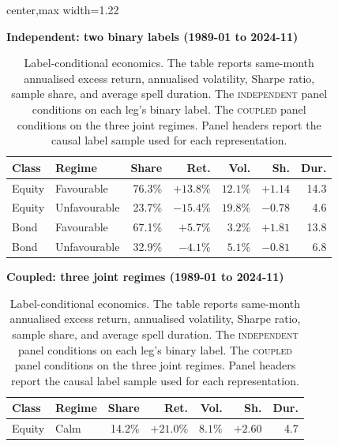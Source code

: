 \documentclass[10pt]{article}
\renewcommand{\arraystretch}{1.0}
\newcommand{\Acoup}{\textsc{coupled}}
\newcommand{\Bindep}{\textsc{independent}}
\begin{document}
\begin{table}[H]
    \centering
    \caption{Label-conditional economics. The table reports same-month annualised excess return,
        annualised volatility, Sharpe ratio, sample share, and average spell duration. The
        \Bindep{} panel conditions on each leg's binary label. The \Acoup{} panel conditions on the
        three joint regimes. Panel headers report the causal label sample used for each
        representation.}
    \label{tab:state-economics}
    \scriptsize
    \setlength{\tabcolsep}{2.4pt}
    \renewcommand{\arraystretch}{0.96}
    \begin{adjustbox}{center,max width=1.22\textwidth}
        \begin{minipage}[t]{0.47\textwidth}
            \centering
             \textbf{Independent: two binary labels (1989-01 to 2024-11)}\\[-1pt]
            \begin{tabular}{@{}llrrrrr@{}}
                \toprule
                Class  & Regime       & Share  & Ret.      & Vol.     & Sh.     & Dur.           \\
                \midrule
                Equity & Favourable   & 76.3\% & $+13.8\%$ & $12.1\%$ & $+1.14$ & 14.3           \\
                Equity & Unfavourable & 23.7\% & $-15.4\%$ & $19.8\%$ & $-0.78$ & \phantom{0}4.6 \\
                Bond   & Favourable   & 67.1\% & $+5.7\%$  & $3.2\%$  & $+1.81$ & 13.8           \\
                Bond   & Unfavourable & 32.9\% & $-4.1\%$  & $5.1\%$  & $-0.81$ & \phantom{0}6.8 \\
                \bottomrule
            \end{tabular}
        \end{minipage}
        \hspace{0.025\textwidth}
        \begin{minipage}[t]{0.57\textwidth}
            \centering
            \textbf{Coupled: three joint regimes (1989-01 to 2024-11)}\\[-1pt]
            \begin{tabular}{@{}llrrrrr@{}}
                \toprule
                Class  & Regime   & Share            & Ret.      & Vol.     & Sh.     & Dur.           \\
                \midrule
                Equity & Calm     & 14.2\%           & $+21.0\%$ & $8.1\%$  & $+2.60$ & \phantom{0}4.7 \\

\end{tabular}
\end{minipage}
\end{adjustbox}
\end{table}
\end{document}

